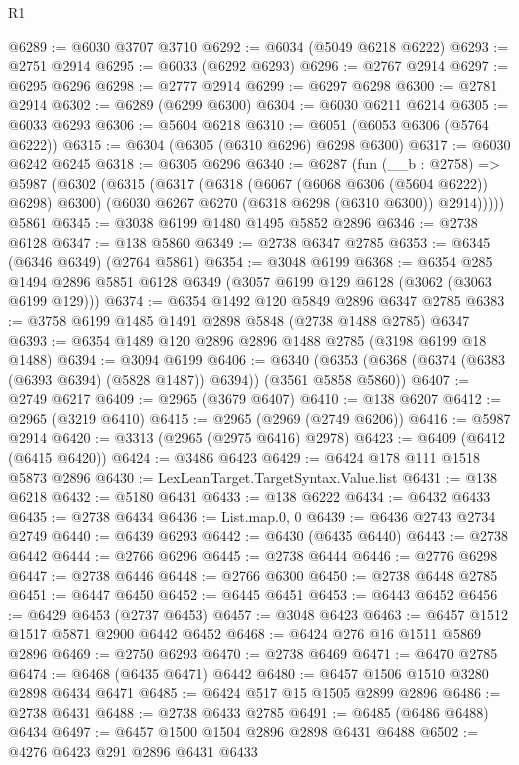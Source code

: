 \begin{lexlean}{R1}
\begin{coremodule}
@6289 := @6030 @3707 @3710
@6292 := @6034 (@5049 @6218 @6222)
@6293 := @2751 @2914
@6295 := @6033 (@6292 @6293)
@6296 := @2767 @2914
@6297 := @6295 @6296
@6298 := @2777 @2914
@6299 := @6297 @6298
@6300 := @2781 @2914
@6302 := @6289 (@6299 @6300)
@6304 := @6030 @6211 @6214
@6305 := @6033 @6293
@6306 := @5604 @6218
@6310 := @6051 (@6053 @6306 (@5764 @6222))
@6315 := @6304 (@6305 (@6310 @6296) @6298 @6300)
@6317 := @6030 @6242 @6245
@6318 := @6305 @6296
@6340 := @6287
    (fun (__b : @2758) =>
    @5987
      (@6302
        (@6315
          (@6317
            (@6318 (@6067 (@6068 @6306 (@5604 @6222)) @6298) @6300)
            (@6030 @6267 @6270 (@6318 @6298 (@6310 @6300)) @2914)))))
    @5861
@6345 := @3038 @6199 @1480 @1495 @5852 @2896
@6346 := @2738 @6128
@6347 := @138 @5860
@6349 := @2738 @6347 @2785
@6353 := @6345 (@6346 @6349) (@2764 @5861)
@6354 := @3048 @6199
@6368 := @6354
    @285
    @1494
    @2896
    @5851
    @6128
    @6349
    (@3057 @6199 @129 @6128 (@3062 (@3063 @6199 @129)))
@6374 := @6354 @1492 @120 @5849 @2896 @6347 @2785
@6383 := @3758 @6199 @1485 @1491 @2898 @5848 (@2738 @1488 @2785) @6347
@6393 := @6354 @1489 @120 @2896 @2896 @1488 @2785 (@3198 @6199 @18 @1488)
@6394 := @3094 @6199
@6406 := @6340 (@6353 (@6368 (@6374 (@6383 (@6393 @6394) (@5828 @1487)) @6394)) (@3561 @5858 @5860))
@6407 := @2749 @6217
@6409 := @2965 (@3679 @6407)
@6410 := @138 @6207
@6412 := @2965 (@3219 @6410)
@6415 := @2965 (@2969 (@2749 @6206))
@6416 := @5987 @2914
@6420 := @3313 (@2965 (@2975 @6416) @2978)
@6423 := @6409 (@6412 (@6415 @6420))
@6424 := @3486 @6423
@6429 := @6424 @178 @111 @1518 @5873 @2896
@6430 := LexLeanTarget.TargetSyntax.Value.list
@6431 := @138 @6218
@6432 := @5180 @6431
@6433 := @138 @6222
@6434 := @6432 @6433
@6435 := @2738 @6434
@6436 := List.map.{0, 0}
@6439 := @6436 @2743 @2734 @2749
@6440 := @6439 @6293
@6442 := @6430 (@6435 @6440)
@6443 := @2738 @6442
@6444 := @2766 @6296
@6445 := @2738 @6444
@6446 := @2776 @6298
@6447 := @2738 @6446
@6448 := @2766 @6300
@6450 := @2738 @6448 @2785
@6451 := @6447 @6450
@6452 := @6445 @6451
@6453 := @6443 @6452
@6456 := @6429 @6453 (@2737 @6453)
@6457 := @3048 @6423
@6463 := @6457 @1512 @1517 @5871 @2900 @6442 @6452
@6468 := @6424 @276 @16 @1511 @5869 @2896
@6469 := @2750 @6293
@6470 := @2738 @6469
@6471 := @6470 @2785
@6474 := @6468 (@6435 @6471) @6442
@6480 := @6457 @1506 @1510 @3280 @2898 @6434 @6471
@6485 := @6424 @517 @15 @1505 @2899 @2896
@6486 := @2738 @6431
@6488 := @2738 @6433 @2785
@6491 := @6485 (@6486 @6488) @6434
@6497 := @6457 @1500 @1504 @2896 @2898 @6431 @6488
@6502 := @4276 @6423 @291 @2896 @6431 @6433

\end{coremodule}
\end{lexlean}
